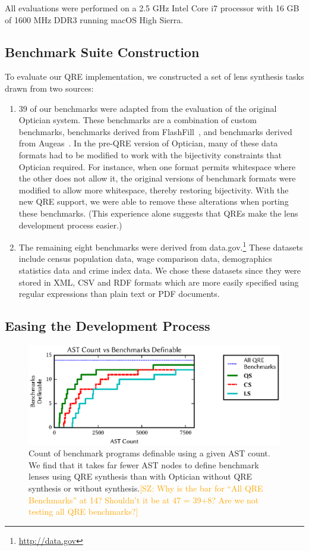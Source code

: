 \documentclass[acmsmall,review,anonymous]{acmart}
\newcommand{\FINISH}[3]{\ifdraft\textcolor{#1}{[#2: #3]}\fi}
\newcommand{\saz}[1]{\FINISH{orange}{SZ}{#1}}
\begin{document}
All evaluations were performed on a 2.5 GHz Intel Core i7 processor with 16 GB
of 1600 MHz DDR3 running macOS High Sierra.


\subsection{Benchmark Suite Construction}

To evaluate our QRE implementation, we constructed a set of lens synthesis tasks
drawn from two sources:
\begin{enumerate}
\item 39 of our benchmarks were adapted from the evaluation of the original
  Optician system.  These benchmarks are a combination of custom benchmarks,
  benchmarks derived from FlashFill~\cite{flashfill}, and benchmarks
  derived from Augeas~\cite{augeas2}. In the pre-QRE version of
  Optician, many of these data formats had to be modified to work with the
  bijectivity constraints that Optician required.  For instance, when one format
  permits whitespace where the other does not allow it, the original versions of
  benchmark formats were modified to allow more whitespace, thereby restoring
  bijectivity.  With the new QRE support, we were able to remove these
  alterations when porting these benchmarks.  (This experience alone suggests
  that QREs make the lens development process easier.)
  
\item The remaining eight benchmarks were derived from
  data.gov.\footnote{\url{http://data.gov}} These datasets include census
  population data, wage comparison data, demographics statistics data and
  crime index data. We chose these datasets since they were stored in XML, CSV
  and RDF formats which are more easily specified using regular expressions than
  plain text or PDF documents.
\end{enumerate}

\subsection{Easing the Development Process}

\begin{figure}[t]
\includegraphics{generated-graphs/asts.eps}
\caption{Count of benchmark programs definable using a given AST count. We find
that it takes far fewer AST nodes to define benchmark lenses using QRE
synthesis than with Optician without QRE synthesis or without synthesis.\saz{Why
is the bar for ``All QRE Benchmarks'' at 14? Shouldn't it be at 47 = 39+8? Are
we not testing all QRE benchmarks?}}
\label{fig:asts}
\end{figure}
\end{document}
